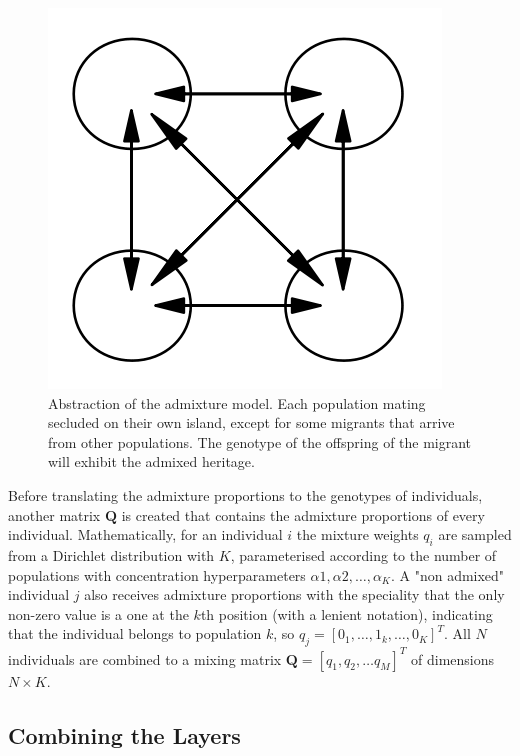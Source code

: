 \documentclass[a4paper, 11pt]{article}
\begin{document}
\begin{figure}
\centering
\includegraphics[scale=0.5]{level_2}
\caption{Abstraction of the admixture model. Each population mating secluded on their own island, except for some migrants that arrive from other populations. The genotype of the offspring of the migrant will exhibit the admixed heritage.}
\end{figure}


Before translating the admixture proportions to the genotypes of individuals, another matrix  $\mathbf{Q}$ is created that contains the admixture proportions of every individual. Mathematically, for an individual $i$ the mixture weights $q_i$ are sampled from a Dirichlet distribution with $K$, parameterised according to the number of populations with concentration hyperparameters $\alpha1, \alpha2, \ldots,  \alpha_K$. A "non admixed" individual $j$ also receives admixture proportions with the speciality that the only non-zero value is a one at the $k$th position (with a lenient notation), indicating that the individual belongs to population $k$, so $q_j = [0_1, \ldots, 1_k, \ldots, 0_K]^T$. All $N$ individuals are combined to a mixing matrix $\mathbf{Q} = [q_1,q_2, \ldots q_M]^T$ of dimensions $N \times K$. \\

\subsection{Combining the Layers}
\end{document}
